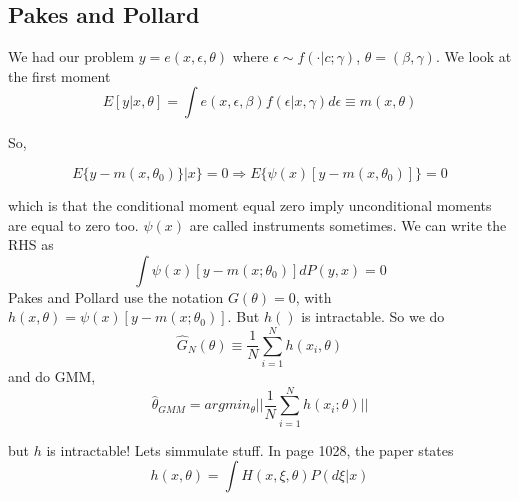 \documentclass[12pt]{article}
\begin{document}
	\subsection{Pakes and Pollard}

	We had our problem $y=e(x,\epsilon, \theta)$ where $\epsilon \sim f(\cdot | c; \gamma ) $, $\theta = (\beta , \gamma)$. We look at the first moment
	\begin{equation}
		E[y | x, \theta] = \int e(x, \epsilon, \beta) f(\epsilon | x, \gamma) d \epsilon \equiv m(x, \theta)
	\end{equation}
	
	So, 
	
	\begin{equation}
		E \{ y - m(x, \theta_0 )\} | x \} = 0 \Rightarrow E\{ \psi(x) [y - m(x, \theta_0 )] \} = 0 
	\end{equation}
	
	which is that the conditional moment equal zero imply unconditional moments are equal to zero too. $\psi(x)$ are called instruments sometimes. We can write the RHS as
	\begin{equation}
		\int \psi(x) [y - m(x; \theta_0)] dP(y,x) = 0
	\end{equation}
	 Pakes and Pollard use the notation $G(\theta) = 0$, with $h(x,\theta) = \psi(x) [y - m(x; \theta_0)]$. But $h()$ is intractable. So we do 
	 \begin{equation}
	 	\hat{G}_N(\theta) \equiv \frac{1}{N} \sum^N_{i=1} h(x_i, \theta)
	 \end{equation}
	 and do GMM, 
	 \begin{equation}
	 	\hat{\theta}_{GMM} = argmin_{\theta} || \frac{1}{N} \sum^N_{i = 1} h(x_i; \theta) ||
	 \end{equation}
	 
	 but $h$ is intractable! Lets simmulate stuff. In page 1028, the paper states
	 \begin{equation}
	 	h(x,\theta) = \int H(x, \xi, \theta ) P(d \xi | x) 
	 \end{equation}
\end{document}
